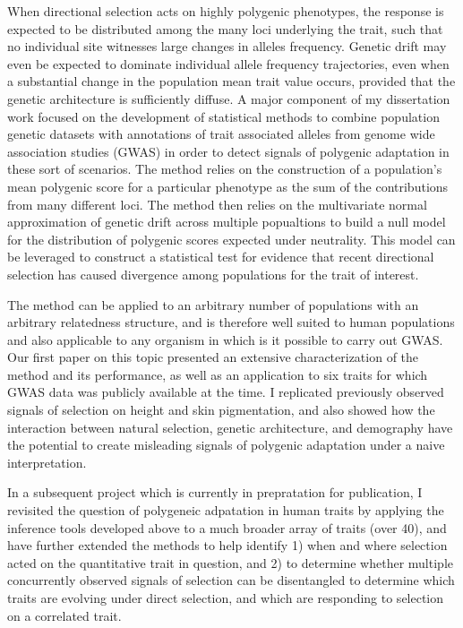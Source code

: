\documentclass[11pt]{article}
\begin{document}
When directional selection acts on highly polygenic phenotypes, the response is expected to be distributed among the many loci underlying the trait, such that no individual site witnesses large changes in alleles frequency. Genetic drift may even be expected to dominate individual allele frequency trajectories, even when a substantial change in the population mean trait value occurs, provided that the genetic architecture is sufficiently diffuse. A major component of my dissertation work focused on the development of statistical methods to combine population genetic datasets with annotations of trait associated alleles from genome wide association studies (GWAS) in order to detect signals of polygenic adaptation in these sort of scenarios. The method relies on the construction of a population's mean polygenic score for a particular phenotype as the sum of the contributions from many different loci. The method then relies on the multivariate normal approximation of genetic drift across multiple popualtions to build a null model for the distribution of polygenic scores expected under neutrality. This model can be leveraged to construct a statistical test for evidence that recent directional selection has caused divergence among populations for the trait of interest.

The method can be applied to an arbitrary number of populations with an arbitrary relatedness structure, and is therefore well suited to human populations and also applicable to any organism in which is it possible to carry out GWAS. Our first paper on this topic presented an extensive characterization of the method and its performance, as well as an application to six traits for which GWAS data was publicly available at the time. I replicated previously observed signals of selection on height and skin pigmentation, and also showed how the interaction between natural selection, genetic architecture, and demography have the potential to create misleading signals of polygenic adaptation under a naive interpretation.

In a subsequent project which is currently in prepratation for publication, I revisited the question of polygeneic adpatation in human traits by applying the inference tools developed above to a much broader array of traits (over 40), and have further extended the methods to help identify 1) when and where selection acted on the quantitative trait in question, and 2) to determine whether multiple concurrently observed signals of selection can be disentangled to determine which traits are evolving under direct selection, and which are responding to selection on a correlated trait.
\end{document}
